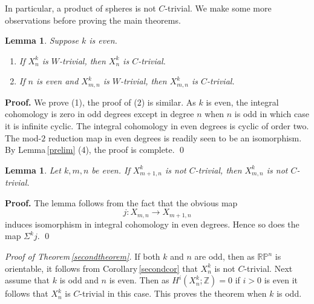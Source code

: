 \documentclass[12pt,reqno]{amsart}
\numberwithin{equation}{subsection}
\newtheorem{Lem}[subsection]{Lemma}
\theoremstyle{definition}
\begin{document}
In particular, a product of spheres is not $C$-trivial. We make some more observations before proving the main theorems. 

\begin{Lem}\label{howdoyoudo} Suppose $k$ is even. 
\begin{enumerate}
\item If $X^k_n$ is $W$-trivial, then $X^k_n$ is $C$-trivial. 
\item If $n$ is even and $X^k_{m,n}$ is $W$-trivial, then $X^k_{m,n}$ is $C$-trivial.
\end{enumerate}
\end{Lem} 
{\bf Proof.} We prove (1), the proof of (2) is similar. As $k$ is even, the integral cohomology is zero in odd degrees except in degree $n$ when $n$ is odd in which case it is infinite cyclic. 
The integral cohomology in even degrees is cyclic of order two. The mod-$2$ reduction map in even degrees is readily seen to be an isomorphism. 
By Lemma\,\ref{prelim} (4), the proof is complete. \qed

\begin{Lem}\label{newlemma}
Let $k,m,n$ be even. If $X^k_{m+1,n}$ is not $C$-trivial, then $X^k_{m,n}$ is not $C$-trivial. 
\end{Lem}
{\bf Proof.} The lemma follows from the fact that the obvious map 
$$j:X_{m,n}\longrightarrow X_{m+1,n}$$
induces isomorphism in integral cohomology in even degrees. Hence so does the map $\Sigma^kj$. \qed

{\em Proof of Theorem\,\ref{secondtheorem}.}  
If both $k$ and $n$ are odd, then as $\mathbb R\mathbb P^n$ is orientable, it follows from 
Corollary\,\ref{secondcor} that $X^k_n$ is not $C$-trivial.  Next assume that 
$k$ is odd and $n$ is even. Then as $H^i(X^k_n;\mathbb Z)=0$ if $i>0$ is even it follows that $X^k_n$ is $C$-trivial in this case. This proves the theorem when $k$ is odd.
\end{document}

